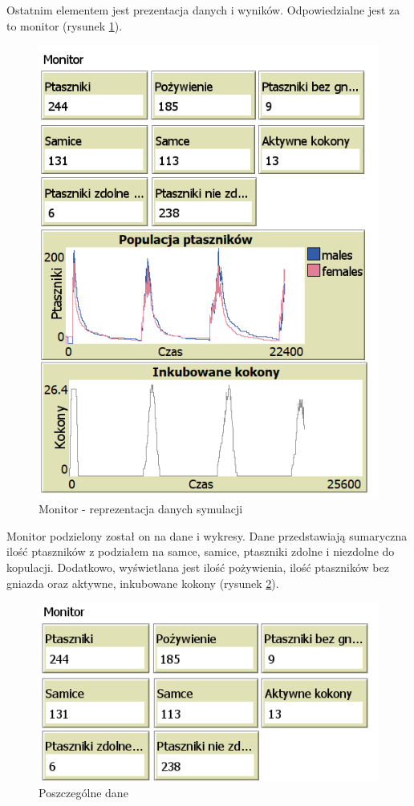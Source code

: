 \documentclass[a4paper,11pt,titlepage]{article}
\begin{document}
Ostatnim elementem jest prezentacja danych i wyników. Odpowiedzialne jest za to monitor (rysunek \ref{fig:2}). 
\begin{figure}[H]
\centering
\includegraphics[width=.5\columnwidth]{img/monitor.PNG}
\caption{Monitor - reprezentacja danych symulacji}
\label{fig:2}
\end{figure}

\noindent Monitor podzielony został on na dane i wykresy. Dane przedstawiają sumaryczna ilość ptaszników z podziałem na samce, samice, ptaszniki zdolne i niezdolne do kopulacji. Dodatkowo, wyświetlana jest ilość pożywienia, ilość ptaszników bez gniazda oraz aktywne, inkubowane kokony (rysunek \ref{fig:3}).

\begin{figure}[H]
\centering
\includegraphics[width=.5\columnwidth]{img/monitor_danych.PNG}
\caption{Poszczególne dane}
\label{fig:3}
\end{figure}
\end{document}

